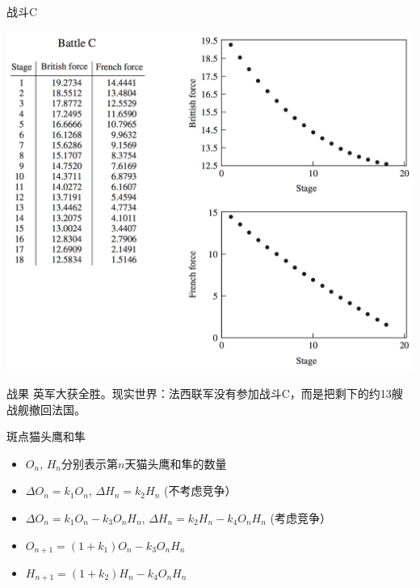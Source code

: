 \documentclass[UTF8, mathserif]{ctexbeamer}
\begin{document}
\begin{frame}{战斗C}
  \begin{center}
    \includegraphics[height=.9\textheight{}]{fight-C.png}
  \end{center}  
\end{frame}

\begin{frame}{战果}
  英军大获全胜。现实世界：法西联军没有参加战斗C，而是把剩下的约13艘战舰撤回法国。

\end{frame}

\begin{frame}{斑点猫头鹰和隼}
  \begin{itemize}
  \item<1-> $O_n$, $H_n$分别表示第$n$天猫头鹰和隼的数量
  \item<2-> $\Delta O_n=k_1O_n$, $\Delta H_n=k_2H_n$ (不考虑竞争）
  \item<3-> $\Delta O_n=k_1O_n - k_3O_nH_n$, $\Delta H_n=k_2H_n-k_4O_nH_n$ (考虑竞争）
  \item<4-> $O_{n+1}=(1+k_1)O_n - k_3O_nH_n$
  \item<4-> $H_{n+1}=(1+k_2)H_n-k_4O_nH_n$
  \end{itemize}
  
\end{frame}
\end{document}
